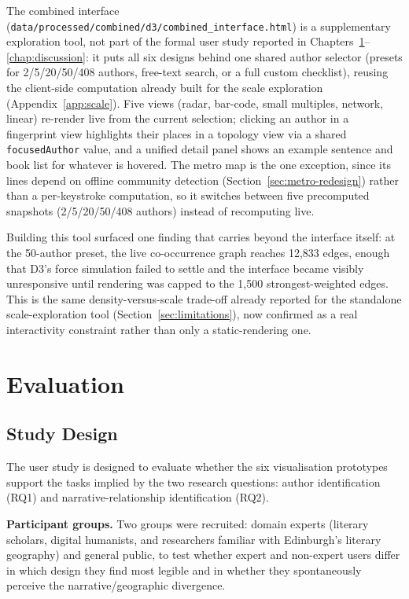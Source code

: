 \documentclass[logo,msc]{infthesis}
\begin{document}
The combined interface (\texttt{data/processed/combined/d3/combined\_interface.html}) is a supplementary exploration tool, not part of the formal user study reported in Chapters~\ref{chap:eval}--\ref{chap:discussion}: it puts all six designs behind one shared author selector (presets for 2/5/20/50/408 authors, free-text search, or a full custom checklist), reusing the client-side computation already built for the scale exploration (Appendix~\ref{app:scale}). Five views (radar, bar-code, small multiples, network, linear) re-render live from the current selection; clicking an author in a fingerprint view highlights their places in a topology view via a shared \texttt{focusedAuthor} value, and a unified detail panel shows an example sentence and book list for whatever is hovered. The metro map is the one exception, since its lines depend on offline community detection (Section~\ref{sec:metro-redesign}) rather than a per-keystroke computation, so it switches between five precomputed snapshots (2/5/20/50/408 authors) instead of recomputing live.

Building this tool surfaced one finding that carries beyond the interface itself: at the 50-author preset, the live co-occurrence graph reaches 12,833 edges, enough that D3's force simulation failed to settle and the interface became visibly unresponsive until rendering was capped to the 1,500 strongest-weighted edges. This is the same density-versus-scale trade-off already reported for the standalone scale-exploration tool (Section~\ref{sec:limitations}), now confirmed as a real interactivity constraint rather than only a static-rendering one.
 
\chapter{Evaluation}
\label{chap:eval}
 
\section{Study Design}
\label{sec:study-design}

The user study is designed to evaluate whether the six visualisation prototypes support the tasks implied by the two research questions: author identification (RQ1) and narrative-relationship identification (RQ2).
 
\textbf{Participant groups.} Two groups were recruited: domain experts (literary scholars, digital humanists, and researchers familiar with Edinburgh's literary geography) and general public, to test whether expert and non-expert users differ in which design they find most legible and in whether they spontaneously perceive the narrative/geographic divergence.
\end{document}
